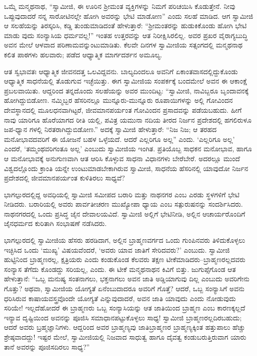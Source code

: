ಒಮ್ಮೆ ಮನ್ಮಥನಾಥ, “ಸ್ವಾಮೀಜಿ, ಈ ಊರಿನ ಶ್ರೀಮಂತ ವ್ಯಕ್ತಿಗಳನ್ನು ನಿಮಗೆ ಪರಿಚಯಿಸಿ ಕೊಡುತ್ತೇನೆ. ನೀವು ಒಪ್ಪುವುದಾದರೆ ನನ್ನ ಸಾರೋಟಿನಲ್ಲೇ ಹೋಗಿ ಅವರನ್ನು ಭೇಟಿ ಮಾಡೋಣ” ಎಂದು ಸಲಹೆ ಮಾಡಿದ. ಆಗ ಸ್ವಾಮೀಜಿ ಆ ಸಲಹೆಯನ್ನು ತಿರಸ್ಕರಿಸಿ, ಕಡ್ಡಿ ತುಂಡುಮಾಡಿದಂತೆ ಹೇಳುತ್ತಾರೆ: “ಶ್ರೀಮಂತರನ್ನು ಹುಡುಕಿಕೊಂಡು ಹೋಗಿ ಭೇಟಿ ಮಾಡು ವುದು ಸಂನ್ಯಾಸಿಯ ಧರ್ಮವಲ್ಲ!” ಇಂತಹ ಉತ್ತರವನ್ನು ಆತ ನಿರೀಕ್ಷಿಸಿರಲಿಲ್ಲ. ಅವರ ಪ್ರಖರ ವೈರಾಗ್ಯಬುದ್ಧಿ ಅವನ ಮೇಲೆ ಆಳವಾದ ಪರಿಣಾಮವನ್ನುಂಟುಮಾಡಿತು. ಕೆಲವೇ ದಿನಗಳ ಸ್ವಾಮೀಜಿಯ ಸತ್ಸಂಗದಲ್ಲಿ ಮನ್ಮಥನಾಥ ಕಲಿತ ಪಾಠಗಳು ಹಲವಾರು; ಪಡೆದ ಆಧ್ಯಾತ್ಮಿಕ ಮಾರ್ಗದರ್ಶನ ಅಮೂಲ್ಯ.

ಆತ ಸ್ವಭಾವತಃ ಆಧ್ಯಾತ್ಮಿಕ ಜೀವನದತ್ತ ಒಲವಿದ್ದವನು. ಬಾಲ್ಯದಿಂದಲೂ ಅವನಿಗೆ ಏಕಾಂತವಾಸದಲ್ಲಿದ್ದುಕೊಂಡು ಆಧ್ಯಾತ್ಮಿಕ ಸಾಧನೆಯಲ್ಲಿ ತೊಡುಗುವ ಇಚ್ಛೆಯಿತ್ತು. ಈಗ ಸ್ವಾಮೀಜಿಯ ಸಂಪರ್ಕಕ್ಕೆ ಬಂದಮೇಲೆ ಅವನ ಈ ಆಕಾಂಕ್ಷೆ ಪ್ರಬಲವಾಯಿತು. ಆದ್ದರಿಂದ ತನ್ನದೊಂದು ಸಲಹೆಯನ್ನು ಅವರ ಮುಂದಿಟ್ಟ: “ಸ್ವಾಮೀಜಿ, ನಾವಿಬ್ಬರೂ ಬೃಂದಾವನಕ್ಕೆ ಹೋಗಿದ್ದುಬಿಡೋಣ. ನಮ್ಮಿಬ್ಬರ ಹೆಸರಿನಲ್ಲೂ ಮುನ್ನೂರು-ಮುನ್ನೂರು ರೂಪಾಯಿಗಳನ್ನು ಅಲ್ಲಿ ಗೋವಿಂದನ ದೇವಸ್ಥಾನದಲ್ಲಿ ಮೂಲಧನವಾಗಿಟ್ಟರೆ, ಜೀವಮಾನಪರ್ಯಂತ ಗೋವಿಂದನ ಪ್ರಸಾದವನ್ನು ಪಡೆಯಬಹುದು. ಹೀಗೆ ನಾವು ಯಾರಿಗೂ ಹೊರೆಯಾಗದ ರೀತಿ ಯಲ್ಲಿ, ಪವಿತ್ರ ಯಮುನಾ ನದಿಯ ತೀರದ ನಿರ್ಜನ ಪ್ರದೇಶದಲ್ಲಿ ಹಗಲಿರುಳೂ ಜಪ-ಧ್ಯಾನ ಗಳಲ್ಲಿ ನಿರತರಾಗಿದ್ದುಬಿಡೋಣ.” ಅದಕ್ಕೆ ಸ್ವಾಮೀಜಿ ಹೇಳುತ್ತಾರೆ: “ನಿಜ ನಿಜ; ಆ ತರಹದ ಮನೋಭಾವದವರಿಗೆ ಈ ಯೋಜನೆ ಬಹಳ ಒಳ್ಳೆಯದೆ. ಆದರೆ ಎಲ್ಲರಿಗೂ ಅಲ್ಲ” ಎಂದು. ‘ಎಲ್ಲರಿಗೂ ಅಲ್ಲ’ ಎಂದರೆ, ‘ತಮ್ಮಂಥವರಿಗಂತೂ ಅಲ್ಲ’ ಎಂಬುದು ಸ್ವಾಮೀಜಿಯ ಇಂಗಿತ. ಪ್ರತಿಯೊಬ್ಬ ಸಾಧಕನ ಮನೋಭಾವ, ಹಾಗೂ ಆ ಮನೋಭಾವಕ್ಕೆ ಅನುಗುಣವಾಗಿ ಆತ ಆರಿಸಿ ಕೊಳ್ಳುವ ಸಾಧನಾ ವಿಧಾನಗಳು ಬೇರೆಬೇರೆ. ಅದರಲ್ಲೂ ಮುಂದೆ ವಿಶ್ವದಲ್ಲೊಂದು ಕ್ರಾಂತಿ ಯನ್ನೇ ಉಂಟುಮಾಡಬೇಕಾಗಿರುವ ಸ್ವಾಮೀಜಿ, ಸಾಧನೆಯ ಹೆಸರಿನಲ್ಲಿ ಯಾವುದೋ ನಿರ್ಜನ ಪ್ರದೇಶದಲ್ಲಿ ಜೀವಮಾನಪರ್ಯಂತ ಕುಳಿತಿರಲು ಸಾಧ್ಯವೆ?

ಭಾಗಲ್ಪುರದಲ್ಲಿದ್ದ ಅವಧಿಯಲ್ಲಿ ಸ್ವಾಮೀಜಿ ಸಮೀಪದ ಬರಾರಿ ಮತ್ತು ನಾಥನಗರ ಎಂಬ ಎರಡು ಸ್ಥಳಗಳಿಗೆ ಭೇಟಿ ನೀಡಿದರು. ಬರಾರಿಯಲ್ಲಿ ಅವರು ಪಾರ್ವತೀಚರಣ ಮುಖ್ಯೋಪಾ ಧ್ಯಾಯ ಎಂಬ ಸತ್ಪುರುಷನನ್ನು ಸಂದರ್ಶಿಸಿದರು. ನಾಥನಗರದಲ್ಲಿ ಒಂದು ಪ್ರಸಿದ್ಧ ಜೈನ ದೇವಾಲಯವಿದೆ. ಸ್ವಾಮೀಜಿ ಅಲ್ಲಿಗೆ ಭೇಟಿನೀಡಿ, ಅಲ್ಲಿನ ಆಚಾರ್ಯರೊಂದಿಗೆ ಜೈನಧರ್ಮದ ಕುರಿತಾಗಿ ಸಂಭಾಷಣೆ ನಡೆಸಿದರು.

ಭಾಗಲ್ಪುರದಲ್ಲಿ ಸ್ವಾಮೀಜಿಯ ಹೆಸರು ಹರಡಿದಾಗ, ಅಲ್ಲಿನ ಬ್ರಾಹ್ಮಣವರ್ಗದ ಒಂದು ಗುಂಪಿನವರು ತಿಳಿದುಕೊಳ್ಳಲು ಇಚ್ಛಿಸಿದ ಒಂದು ‘ಮುಖ್ಯ’ ವಿಷಯವೆಂದರೆ, ‘ಅವರು ಯಾವ ಜಾತಿಗೆ ಸೇರಿದವರು?’ ಎಂಬುದು. ಸ್ವಾಮೀಜಿ ಹುಟ್ಟಿನಿಂದ ಬ್ರಾಹ್ಮಣರಲ್ಲ, ಕ್ಷತ್ರಿಯರು ಎಂದು ಕಂಡುಕೊಂಡ ಕೆಲವರು ತಕ್ಷಣ ಟೀಕೆಮಾಡಿದರು–ಬ್ರಾಹ್ಮಣರಲ್ಲದವರು ಸಂನ್ಯಾಸ ತೆಗೆದು ಕೊಂಡದ್ದು ಸರಿಯಲ್ಲ, ಎಂದು. ಈ ಟೀಕೆ ಮನ್ಮಥನಾಥನ ಕಿವಿಗೆ ಬಿತ್ತು. ಜುಗುಪ್ಸೆಗೊಂಡ ಆತ ಹೇಳುತ್ತಾನೆ: “ಒಬ್ಬ ಮನುಷ್ಯ ಸಂತನಾಗಲು, ಭಕ್ತನಾಗಲು ಅವನ ಜಾತಿ ಅಡ್ಡಿಯಾಗುವು ದಿಲ್ಲ ಎಂಬುದು ಅವರಿಗೇನು ಗೊತ್ತು? ಅಥವಾ, ಸ್ವಾಮೀಜಿಯ ಯೋಗ್ಯತೆ ಏನೆಂಬುದಾದರೂ ಅವರಿಗೆ ಗೊತ್ತೆ? ಆದರೆ, ಒಬ್ಬ ಸಂನ್ಯಾಸಿಗೆ ಅವನು ಧರಿಸಿರುವ ಕಾಷಾಯವಸ್ತ್ರವೊಂದೇ ಯೋಗ್ಯತೆ ಎನ್ನುವುದಾದರೆ, ಅವನ ಜಾತಿ ಯಾವುದು ಎಂದು ನೋಡುವುದು ಸರಿಯೇ! ಇಲ್ಲದೆಹೋದರೆ ಈ ಬ್ರಾಹ್ಮಣರು ಒಬ್ಬ ಸಂನ್ಯಾಸಿಯನ್ನು ಆತ ಜಾತಿಯಿಂದ ಬ್ರಾಹ್ಮಣ ಎಂಬ ಕಾರಣಕ್ಕಲ್ಲದೆ ಇನ್ಯಾವ ದೃಷ್ಟಿಯಿಂದ ಅವನನ್ನು ಪೂಜಿಸಿ ಸಮಾಧಾನಪಟ್ಟುಕೊಳ್ಳಲು ಸಾಧ್ಯ! ಸ್ವಾಮೀಜಿ ಬ್ರಾಹ್ಮಣರಲ್ಲದಿರಬಹುದು; ಆದರೆ ಅವರು ಬ್ರಹ್ಮಜ್ಞಾನಿಗಳು. ಆದ್ದರಿಂದ ಅವರ ಬ್ರಾಹ್ಮಣ್ಯವು ಜಾತಿಬ್ರಾಹ್ಮಣರ ಬ್ರಾಹ್ಮಣ್ಯಕ್ಕಿಂತ ಹತ್ತುಪಾಲು ಹೆಚ್ಚು ಶ್ರೇಷ್ಠವಾದದ್ದು! ಇಷ್ಟರ ಮೇಲೆ, ಸ್ವಾಮೀಜಿಯಲ್ಲಿ ನಿಜವಾದ ಸಾಧುತ್ವ ಹಾಗೂ ದೈವತ್ವ ಕಂಡುಬರುತ್ತಿರುವಾಗ ಯಾರು ತಾನೆ ಅವರನ್ನು ಪೂಜಿಸದಿರಲು ಸಾಧ್ಯ?”

